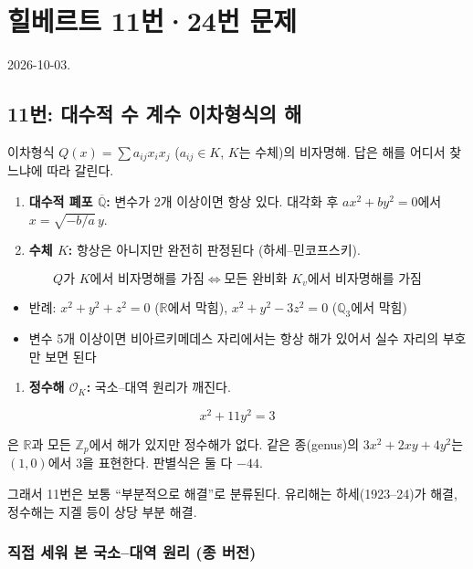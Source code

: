 \section{힐베르트 11번·24번 문제}

2026-10-03.

\subsection{11번: 대수적 수 계수 이차형식의 해}

이차형식 \(Q(x)=\sum a_{ij}x_ix_j\) (\(a_{ij}\in K\), \(K\)는 수체)의
비자명해. 답은 해를 어디서 찾느냐에 따라 갈린다.

\begin{enumerate}
\def\labelenumi{\arabic{enumi}.}
\tightlist
\item
  \textbf{대수적 폐포 \(\overline{\mathbb Q}\):} 변수가 2개 이상이면
  항상 있다. 대각화 후 \(ax^2+by^2=0\)에서 \(x=\sqrt{-b/a}\,y\).
\item
  \textbf{수체 \(K\):} 항상은 아니지만 완전히 판정된다
  (하세--민코프스키).
\end{enumerate}

\[
Q\text{가 }K\text{에서 비자명해를 가짐}\iff\text{모든 완비화 }K_v\text{에서 비자명해를 가짐}
\]

\begin{itemize}
\tightlist
\item
  반례: \(x^2+y^2+z^2=0\) (\(\mathbb R\)에서 막힘), \(x^2+y^2-3z^2=0\)
  (\(\mathbb Q_3\)에서 막힘)
\item
  변수 5개 이상이면 비아르키메데스 자리에서는 항상 해가 있어서 실수
  자리의 부호만 보면 된다
\end{itemize}

\begin{enumerate}
\def\labelenumi{\arabic{enumi}.}
\setcounter{enumi}{2}
\tightlist
\item
  \textbf{정수해 \(\mathcal O_K\):} 국소--대역 원리가 깨진다.
\end{enumerate}

\[
x^2+11y^2=3
\]

은 \(\mathbb R\)과 모든 \(\mathbb Z_p\)에서 해가 있지만 정수해가 없다.
같은 종(genus)의 \(3x^2+2xy+4y^2\)는 \((1,0)\)에서 3을 표현한다.
판별식은 둘 다 \(-44\).

그래서 11번은 보통 ``부분적으로 해결''로 분류된다. 유리해는
하세(1923--24)가 해결, 정수해는 지겔 등이 상당 부분 해결.

\subsubsection{직접 세워 본 국소--대역 원리 (종 버전)}

